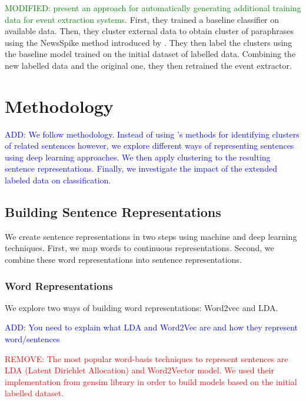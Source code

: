\documentclass[11pt]{article}
\newcommand\add[1]{{\textcolor{blue}{ADD: #1}}}
\newcommand\mod[1]{{\textcolor{green}{MODIFIED: #1}}}
\newcommand\remove[1]{{\textcolor{red}{REMOVE: #1}}}
\begin{document}
\cite{N18-2058} \mod{present an approach for automatically generating additional training data for event extraction systems}. First, they trained a baseline classifier on available data. Then, they cluster external data to obtain cluster of paraphrases using the NewsSpike method introduced by \cite{zhang2015}. They then label the clusters using the baseline model trained on the initial dataset of labelled data. Combining the new labelled data and the original one, they then retrained the event extractor.

\section{Methodology}

\add{We follow \cite{N18-2058} methodology. Instead of using \cite{zhang2015}'s methods for identifying clusters of related sentences however, we explore different ways of representing sentences using deep learning approaches. We then apply clustering to the resulting sentence representations. Finally, we investigate the impact of the extended labeled data on classification. }





\subsection{Building Sentence Representations}

We create sentence representations in two steps using machine and deep learning techniques. First, we map words to continuous representations. Second, we combine these word representations into sentence representations. 

\subsubsection{Word Representations}

We explore two ways of building word representations: Word2vec and LDA.

\add{You need to explain what LDA and Word2Vec are and how they represent word/sentences}


\remove{The most popular word-basis techniques to represent sentences are LDA (Latent Dirichlet Allocation) and Word2Vector model. We used their implementation from gensim library in order to build models based on the initial labelled dataset.
}
\end{document}
